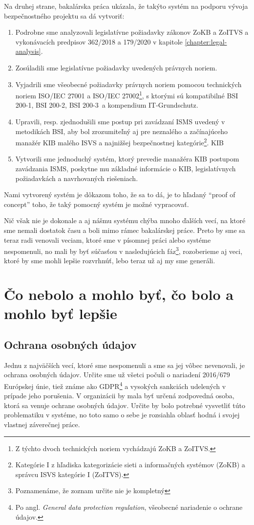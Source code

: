 Na druhej strane, bakalárska práca ukázala, že takýto systém na podporu vývoja bezpečnostného projektu sa dá vytvoriť:
\begin{enumerate}
  \item Podrobne sme analyzovali legislatívne požiadavky zákonov ZoKB a ZoITVS a vykonávacích predpisov 362/2018 a 179/2020
    v kapitole \ref{chapter:legal-analysis}.
  \item Zosúladili sme legislatívne požiadavky uvedených právnych noriem.
  \item Vyjadrili sme všeobecné požiadavky právnych noriem pomocou technických noriem ISO/IEC 27001\cite{27001} a
    ISO/IEC 27002\cite{27002}\footnote{Z týchto dvoch technických noriem vychádzajú ZoKB a ZoITVS.}, s ktorými sú
    kompatibilné BSI 200-1, BSI 200-2, BSI 200-3\ a kompendium IT-Grundschutz.
  \item Upravili, resp. zjednodušili sme postup pri zavádzaní ISMS uvedený v metodikách BSI, aby bol zrozumiteľný aj pre
    neznalého a začínajúceho manažér KIB malého ISVS a najnižšej bezpečnostnej kategórie\footnote{Kategórie I z hľadiska
    kategorizácie sieti a informačných systémov (ZoKB) a správcu ISVS kategórie I (ZoITVS).}.
    KIB
  \item Vytvorili sme jednoduchý systém, ktorý prevedie manažéra KIB postupom zavádzania ISMS, poskytne mu základné informácie
    o KIB, legislatívnych požiadavkách a navrhovaných riešeniach.
\end{enumerate}
Nami vytvorený systém je dôkazom toho, že sa to dá, je to hľadaný \enquote{proof of concept} toho, že taký pomocný systém 
je možné vypracovať.

Nič však nie je dokonale a aj nášmu systému chýba mnoho ďalších vecí, na ktoré sme nemali dostatok času a boli mimo rámec 
bakalárskej práce. Preto by sme sa teraz radi venovali veciam, ktoré sme v písomnej práci alebo systéme nespomenuli, no
mali by byť súčasťou v nasledujúcich fáz\footnote{Poznamenáme, že zoznam určite nie je kompletný}, rozoberieme aj veci,
ktoré by sme mohli lepšie rozvrhnúť, lebo teraz už aj my sme generáli.

\section{Čo nebolo a mohlo byť, čo bolo a mohlo byť lepšie}

\subsection*{Ochrana osobných údajov}
Jednu z najväčších vecí, ktoré sme nespomenuli a sme sa jej vôbec nevenovali, je ochrana osobných údajov. Určite sme už všetci
počuli o nariadení 2016/679 Európskej únie, tiež známe ako GDPR\footnote{Po angl. \textit{General data protection regulation},
všeobecné nariadenie o ochrane údajov.} a vysokých sankciách udelených v prípade jeho porušenia. V organizácii by mala byť
určená zodpovedná osoba, ktorá sa venuje ochrane osobných údajov. Určite by bolo potrebné vysvetliť túto problematiku v
systéme, no toto samo o sebe je rozsiahla oblasť hodná i svojej vlastnej záverečnej práce.

